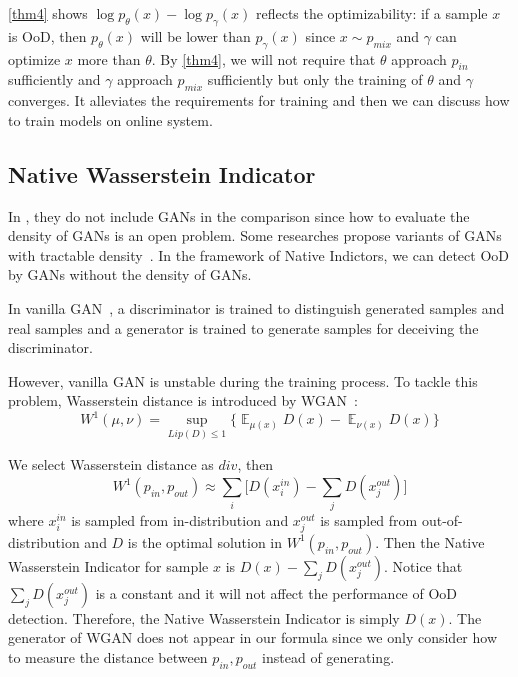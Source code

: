 \documentclass[letterpaper]{article} %
\newcommand{\E}{\operatorname{\mathbb{E}}}
\newcommand{\pin}{p_{in}}
\newcommand{\pout}{p_{out}}
\newcommand{\pmix}{p_{mix}}
\begin{document}
\cref{thm4} shows $\log p_\theta(x) - \log p_\gamma(x)$ reflects the optimizability: if a sample $x$ is OoD, then $p_\theta(x)$ will be lower than $p_\gamma(x)$ since $x \sim \pmix$ and $\gamma$ can optimize $x$ more than $\theta$. By \cref{thm4}, we will not require that $\theta$ approach $\pin$ sufficiently and $\gamma$ approach $\pmix$ sufficiently but only the training of $\theta$ and $\gamma$ converges. It alleviates the requirements for training and then we can discuss how to train models on online system. 

\subsection{Native Wasserstein Indicator}
In \cite{nalisnick2018deep}, they do not include GANs in the comparison since how to evaluate the density of GANs is an open problem. Some researches propose  variants of GANs with tractable density~\cite{kumar2019maximum}. In the framework of Native Indictors, we can detect OoD by GANs without the density of GANs. 

In vanilla GAN~\cite{goodfellow2014generative}, a discriminator is trained to distinguish generated samples and real samples and  a generator is trained to generate samples for deceiving the discriminator.

However, vanilla GAN is unstable during the training process. To tackle this problem, Wasserstein distance is introduced by WGAN~\cite{arjovsky2017wasserstein}:
\begin{equation}
	W^1(\mu, \nu) = \sup_{Lip(D) \leq 1} \{\E_{\mu(x)} D(x)  - \E_{\nu(x)} D(x)\}
\end{equation}

We select Wasserstein distance as $div$, then
\begin{equation}
	W^1(\pin, \pout) \approx \sum_i \Big[D(x_i^{in}) - \sum_j D(x_j^{out})\Big]
\end{equation} 
where $x_i^{in}$ is sampled from in-distribution and $x_j^{out}$ is sampled from out-of-distribution and $D$ is the optimal solution in $W^1(\pin, \pout)$. Then the Native Wasserstein Indicator for sample $x$ is $D(x) - \sum_{j} D(x_j^{out})$. Notice that $\sum_{j} D(x_j^{out})$ is a constant and it will not affect the performance of OoD detection. Therefore, the Native Wasserstein Indicator is simply $D(x)$. The generator of WGAN does not appear in our formula since we only consider how to measure the distance between $\pin, \pout$ instead of generating. 
\end{document}
